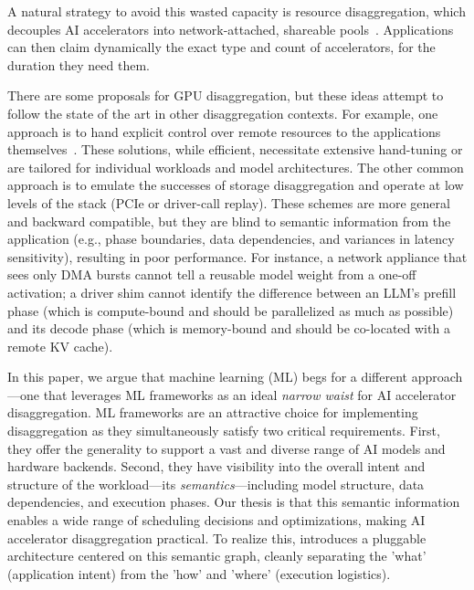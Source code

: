 A natural strategy to avoid this wasted capacity is resource disaggregation, 
which decouples AI accelerators into network-attached, shareable pools~\cite{logos,federated_coherence,lim2012system,gimbal}.
Applications can then claim dynamically
  the exact type and count of accelerators, for the duration they need them.

There are some proposals for GPU disaggregation, but these ideas 
attempt to follow the state of the art in other disaggregation contexts.
For example, one approach is to hand explicit control over remote resources to the applications themselves~\cite{distserve-2024,prism-2025}.
These solutions, while efficient, necessitate extensive hand-tuning or are
  tailored for individual workloads and model architectures.
The other common approach is to emulate the successes of storage disaggregation and operate at low levels of the stack
  (PCIe or driver-call replay).
These schemes are more general and backward compatible, but they are
blind to semantic information from the application (e.g., phase boundaries, data dependencies, and variances in latency sensitivity), resulting in 
poor performance.
For instance, a network appliance that sees only DMA bursts cannot tell a reusable model weight from a one-off activation; 
a driver shim cannot identify the difference between an LLM's prefill phase (which is compute-bound and should be parallelized as much as possible) and its decode phase (which is memory-bound and should be co-located with a remote KV cache).

In this paper, we argue that machine learning (ML) begs for a different approach---one that leverages ML frameworks as an ideal \emph{narrow waist} for AI accelerator disaggregation.
ML frameworks are an attractive choice for implementing disaggregation
  as they simultaneously satisfy two critical requirements.
First, they offer the generality to support a vast and diverse range of AI models and hardware backends.
Second, they have visibility into the overall intent and structure of the workload---its \textit{semantics}---including model structure, data dependencies, and execution phases.
Our thesis is that this semantic information enables a wide range of scheduling decisions and optimizations, making
AI accelerator disaggregation practical.
To realize this, \sys introduces a pluggable architecture centered on this semantic graph, cleanly separating the 'what' (application intent) from the 'how' and 'where' (execution logistics). 

